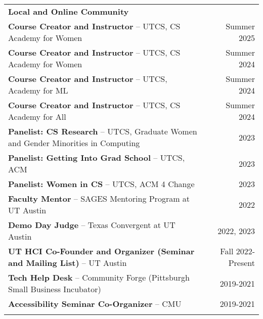 \begin{longtable}{Xr}
	\textbf{Local and Online Community} &  \\
	\textbf{Course Creator and Instructor} -- UTCS, CS Academy for Women & Summer 2025 \\
	\textbf{Course Creator and Instructor} -- UTCS, CS Academy for Women & Summer 2024 \\
	\textbf{Course Creator and Instructor} -- UTCS, Academy for ML & Summer 2024 \\
	\textbf{Course Creator and Instructor} -- UTCS, CS Academy for All & Summer 2024 \\
	\textbf{Panelist: CS Research} -- UTCS, Graduate Women and Gender Minorities in Computing & 2023 \\
	\textbf{Panelist: Getting Into Grad School} -- UTCS, ACM & 2023 \\
	\textbf{Panelist: Women in CS} -- UTCS, ACM 4 Change & 2023 \\
	\textbf{Faculty Mentor} -- SAGES Mentoring Program at UT Austin & 2022 \\
	\textbf{Demo Day Judge} -- Texas Convergent at UT Austin & 2022, 2023 \\
	\textbf{UT HCI Co-Founder and Organizer (Seminar and Mailing List)} -- UT Austin & Fall 2022-Present \\
	\textbf{Tech Help Desk} -- Community Forge (Pittsburgh Small Business Incubator) & 2019-2021 \\
	\textbf{Accessibility Seminar Co-Organizer} -- CMU & 2019-2021 \\
	\\

\end{longtable}